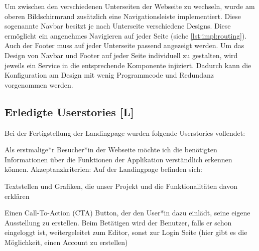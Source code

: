 Um zwischen den verschiedenen Unterseiten der Webseite zu wechseln, wurde am oberen Bildschirmrand zusätzlich eine Navigationsleiste implementiert. Diese sogenannte Navbar besitzt je nach Unterseite verschiedene Designs. Diese ermöglicht ein angenehmes Navigieren auf jeder Seite (siehe \ref{lst:impl:routing}). Auch der Footer muss auf jeder Unterseite passend angezeigt werden. Um das Design von Navbar und Footer auf jeder Seite individuell zu gestalten, wird jeweils ein Service  in die entsprechende Komponente injiziert. Dadurch kann die Konfiguration am Design mit wenig Programmcode und Redundanz vorgenommen werden.

\subsection{Erledigte Userstories [L]}
\label{Finished Landingpage}
Bei der Fertigstellung der Landingpage wurden folgende Userstories vollendet: 
\begin{compactitem}
    \item Als erstmalige*r Besucher*in der Webseite möchte ich die benötigten Informationen über die Funktionen der Applikation verständlich erkennen können. Akzeptanzkriterien:
    Auf der Landingpage befinden sich:
    \begin{compactitem}
        \item Textstellen und Grafiken, die unser Projekt und die Funktionalitäten davon erklären
        \item Einen Call-To-Action (CTA) Button, der den User*in dazu einlädt, seine eigene Ausstellung zu erstellen. Beim Betätigen wird der Benutzer, falls er schon eingeloggt ist, weitergeleitet zum Editor, sonst zur Login Seite (hier gibt es die Möglichkeit, einen Account zu erstellen)
    \end{compactitem}
\end{compactitem}

